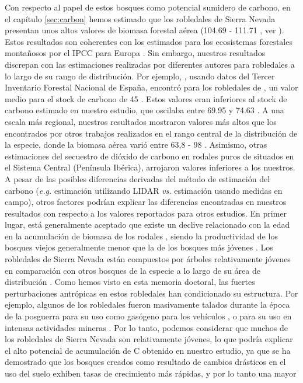 Con respecto al papel de estos bosques como potencial sumidero de carbono, en el capítulo \ref{sec:carbon} hemos estimado que los robledales de Sierra Nevada presentan unos altos valores de biomasa forestal aérea (104.69 - 111.71 \mgha, ver ). Estos resultados son coherentes con los estimados para los ecosistemas forestales montañosos por el IPCC para Europa \autocite[130 (20 - 600) \mgha; ][]{IPCC2006ForestLand}. Sin embargo, nuestros resultados discrepan con las estimaciones realizadas por diferentes autores para robledales a lo largo de su rango de distribución. Por ejemplo, \citet{Vayredaetal2012SpatialPatterns}, usando datos del Tercer Inventario Forestal Nacional de España, encontró para los robledales de \Qp, un valor medio para el stock de carbono de 45 \mgha. Estos valores eran inferiores al stock de carbono estimado en nuestro estudio, que oscilaba entre 69.95 y 74.63 \mgha. A una escala más regional, nuestros resultados mostraron valores más altos que los encontrados por otros trabajos realizados en el rango central de la distribución de la especie, donde la biomasa aérea varió entre 63,8 - 98 \mgha \autocite{GallardoLanchoGonzalezHernandez2004SequestrationCarbon}. Asimismo, otras estimaciones del secuestro de dióxido de carbono en rodales puros de \Qp situados en el Sistema Central (Península Ibérica), arrojaron valores inferiores a los nuestros. A pesar de las posibles diferencias derivadas del método de estimación del carbono (\emph{e.g.} estimación utilizando LIDAR \emph{vs.} estimación usando medidas en campo), otros factores podrían explicar las diferencias encontradas en nuestros resultados con respecto a los valores reportados para otros estudios. En primer lugar, está generalmente aceptado que existe un declive relacionado con la edad en la acumulación de biomasa de los rodales \autocite[][y referencias incluidas en ese trabajo]{Xuetal2012AgerelatedDecline}, siendo la productividad de los bosques viejos generalmente menor que la de los bosques más jóvenes \autocite{Kutschetal2009EcophysiologicalCharacteristics}. Los robledales de Sierra Nevada están compuestos por árboles relativamente jóvenes \autocite{GeaIzquierdoCanellas2014LocalClimate,PerezLuqueetal2020LanduseLegacies,RubioCuadradoetal2018AbioticFactors} en comparación con otros bosques de la especie a lo largo de su área de distribución \autocite{GeaIzquierdoCanellas2014LocalClimate}. Como hemos visto en esta memoria doctoral, las fuertes perturbaciones antrópicas en estos robledales han condicionado su estructura. Por ejemplo, algunos de los robledales fueron masivamente talados durante la época de la posguerra para su uso como gasógeno para los vehículos \autocite[\emph{e.g.} robledal San Jerónimo, MON;][]{Prieto1975BosquesSierra}, o para su uso en intensas actividades mineras \autocite[\emph{e.g.} fundición de mineral en el entorno del robledal de San Juan, GEN][]{PerezLuqueetal2020LanduseLegacies}. Por lo tanto, podemos considerar que muchos de los robledales de Sierra Nevada son relativamente jóvenes, lo que podría explicar el alto potencial de acumulación de C obtenido en nuestro estudio, ya que se ha demostrado que los bosques creados como resultado de cambios drásticos en el uso del suelo exhiben tasas de crecimiento más rápidas, y por lo tanto una mayor 